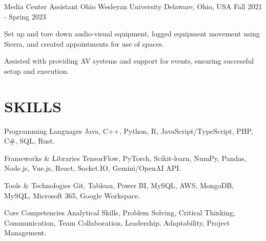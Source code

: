 \documentclass[10pt, letterpaper]{article}
\begin{document}
\begin{experienceentry}
  {Media Center Assistant} %
  {Ohio Wesleyan University} %
  {Delaware, Ohio, USA} %
  {Fall 2021 - Spring 2023} %
  \item Set up and tore down audio-visual equipment, logged equipment movement using Sierra, and created appointments for use of spaces.
  \item Assisted with providing AV systems and support for events, ensuring successful setup and execution.
\end{experienceentry}

\vspace{\headerSpacing}

\section{SKILLS}

\begin{skillcategory}{Programming Languages}
  Java, C++, Python, R, JavaScript/TypeScript, PHP, C\#, SQL, Rust.
\end{skillcategory}

\begin{skillcategory}{Frameworks \& Libraries}
  TensorFlow, PyTorch, Scikit-learn, NumPy, Pandas, Node.js, Vue.js, React, Socket.IO, Gemini/OpenAI API.
\end{skillcategory}

\begin{skillcategory}{Tools \& Technologies}
  Git, Tableau, Power BI, MySQL, AWS, MongoDB, MySQL, Microsoft 365, Google Workspace.
\end{skillcategory}

\begin{skillcategory}{Core Competencies}
  Analytical Skills, Problem Solving, Critical Thinking, Communication, Team Collaboration, Leadership, Adaptability, Project Management.
\end{skillcategory}
\end{document}
